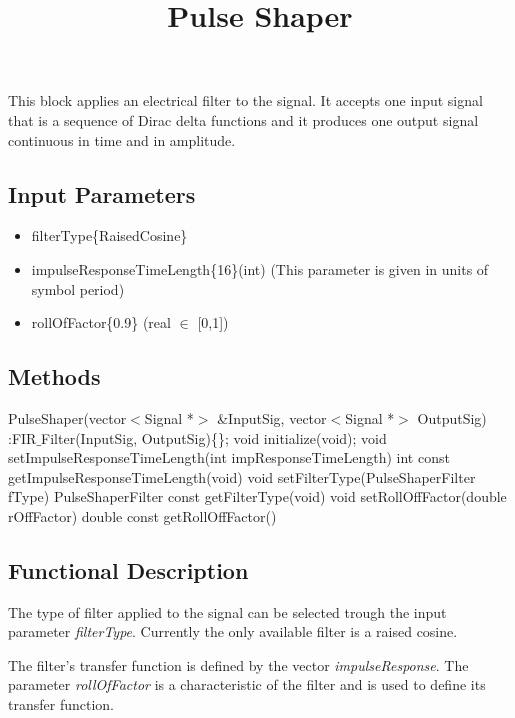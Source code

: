 \documentclass[a4paper]{article}
\title{Pulse Shaper}
\begin{document}
\maketitle

This block applies an electrical filter to the signal. It accepts one input signal that is a sequence of Dirac delta functions and it produces one output signal continuous in time and in amplitude.

\subsection*{Input Parameters}

\begin{itemize}
	\item filterType\{RaisedCosine\} \linebreak
	\item impulseResponseTimeLength\{16\}\linebreak (int) 
	\linebreak (This parameter is given in units of symbol period)
	\item rollOfFactor\{0.9\} \linebreak
	(real $\in$ [0,1])
\end{itemize}

\subsection*{Methods}

PulseShaper(vector$<$Signal *$>$ \&InputSig, vector$<$Signal *$>$ OutputSig) :FIR$\_$Filter(InputSig, OutputSig)\{\};
\bigbreak	
void initialize(void);
\bigbreak	
void setImpulseResponseTimeLength(int impResponseTimeLength)
\bigbreak
int const getImpulseResponseTimeLength(void)
\bigbreak	
void setFilterType(PulseShaperFilter fType)
\bigbreak
PulseShaperFilter const getFilterType(void)
\bigbreak	
void setRollOffFactor(double rOffFactor)
\bigbreak
double const getRollOffFactor()

\subsection*{Functional Description}

The type of filter applied to the signal can be selected trough the input parameter \textit{filterType}. Currently the only available filter is a raised cosine.

The filter's transfer function is defined by the vector \textit{impulseResponse}. The parameter \textit{rollOfFactor} is a characteristic of the filter and is used to define its transfer function.
\end{document}
